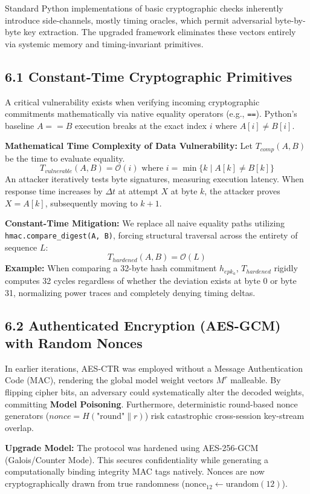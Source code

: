\documentclass[12pt]{article}
\begin{document}
Standard Python implementations of basic cryptographic checks inherently introduce side-channels, mostly timing oracles, which permit adversarial byte-by-byte key extraction. The upgraded framework eliminates these vectors entirely via systemic memory and timing-invariant primitives.

\subsection*{6.1 Constant-Time Cryptographic Primitives}

A critical vulnerability exists when verifying incoming cryptographic commitments mathematically via native equality operators (e.g., \verb|==|). Python's baseline $A == B$ execution breaks at the exact index $i$ where $A[i] \ne B[i]$.

\textbf{Mathematical Time Complexity of Data Vulnerability:}
Let $T_{comp}(A, B)$ be the time to evaluate equality.
\[
T_{vulnerable}(A, B) = \mathcal{O}(i) \text{ where } i = \min \{k \mid A[k] \ne B[k] \}
\]
An attacker iteratively tests byte signatures, measuring execution latency. When response time increases by $\Delta t$ at attempt $X$ at byte $k$, the attacker proves $X=A[k]$, subsequently moving to $k+1$.

\textbf{Constant-Time Mitigation:}
We replace all naive equality paths utilizing \verb|hmac.compare_digest(A, B)|, forcing structural traversal across the entirety of sequence $L$:
\[
T_{hardened}(A, B) = \mathcal{O}(L) 
\]
\textbf{Example:} When comparing a 32-byte hash commitment $h_{epk_a}$, $T_{hardened}$ rigidly computes 32 cycles regardless of whether the deviation exists at byte 0 or byte 31, normalizing power traces and completely denying timing deltas. 

\subsection*{6.2 Authenticated Encryption (AES-GCM) with Random Nonces}

In earlier iterations, AES-CTR was employed without a Message Authentication Code (MAC), rendering the global model weight vectors $M^r$ malleable. By flipping cipher bits, an adversary could systematically alter the decoded weights, committing \textbf{Model Poisoning}. Furthermore, deterministic round-based nonce generators ($nonce = H(\text{"round"} \parallel r)$) risk catastrophic cross-session key-stream overlap.

\textbf{Upgrade Model:}
The protocol was hardened using AES-256-GCM (Galois/Counter Mode). This secures confidentiality while generating a computationally binding integrity MAC tags natively. Nonces are now cryptographically drawn from true randomness ($\text{nonce}_{12} \leftarrow \text{urandom}(12)$).
\end{document}
